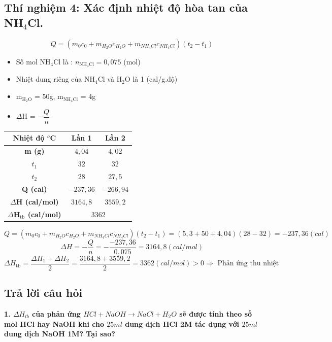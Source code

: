 \documentclass[12pt,a4paper]{report}
\begin{document}
\subsection*{Thí nghiệm 4: Xác định nhiệt độ hòa tan của NH$_4$Cl.}
\[
    Q = (m_0c_0 + m_{H_2O}c_{H_2O} + m_{NH_4Cl}c_{NH_4Cl})(t_2 - t_1)
\]
\begin{itemize}
    \item Số mol NH$_4$Cl là : $n_\text{NH$_4$Cl} = 0,075$ (mol)
    \item Nhiệt dung riêng của NH$_4$Cl và H$_2$O là 1 (cal/g.độ)
    \item m$_\text{H$_2$O}$ = 50g, m$_\text{NH$_4$Cl}$ = 4g
    \item $\Delta$H = $-\dfrac{Q}{n}$
\end{itemize}
\begin{table}[h!]
\centering
\begin{tabular}{|c|cc|}
\hline
\textbf{Nhiệt độ $^o$C}                  & \multicolumn{1}{c|}{\textbf{Lần 1}} & \textbf{Lần 2} \\ \hline
\textbf{m (g)}                           & \multicolumn{1}{c|}{$4,04$}         & $4,02$         \\ \hline
\textbf{$t_1$}                           & \multicolumn{1}{c|}{$32$}           & $32$           \\ \hline
\textbf{$t_2$}                           & \multicolumn{1}{c|}{$28$}           & $27,5$         \\ \hline
\textbf{Q (cal)}                         & \multicolumn{1}{c|}{$-237,36$}      & $-266,94$      \\ \hline
\textbf{$\Delta$H (cal/mol)}             & \multicolumn{1}{c|}{$3164,8$}       & $3559,2$       \\ \hline
\textbf{$\Delta$H$_\text{tb}$ (cal/mol)} & \multicolumn{2}{c|}{3362}                            \\ \hline
\end{tabular}
\end{table}
\[
    Q = (m_0c_0 + m_{H_2O}c_{H_2O} + m_{NH_4Cl}c_{NH_4Cl})(t_2 - t_1) = (5,3 + 50 +4,04)(28-32) = -237,36 (cal)
\]
\[
    \Delta H = - \frac{Q}{n} = - \frac{-237,36}{0,075} = 3164,8 (cal/mol)
\]
\[
    \Delta H_\text{tb} = \frac{\Delta H_1 + \Delta H_2}{2} = \frac{3164,8 + 3559,2}{2} = 3362 (cal/mol) > 0 \Rightarrow \text{ Phản ứng thu nhiệt}    
\]
\subsection{Trả lời câu hỏi}
\noindent\textbf{1. $\Delta H_{tb}$ của phản ứng $HCl + NaOH \rightarrow NaCl + H_2O$ sẽ được tính theo số mol HCl hay NaOH khi cho $25ml$ dung dịch HCl 2M tác dụng với $25ml$ dung dịch NaOH 1M? Tại sao?}
\end{document}
